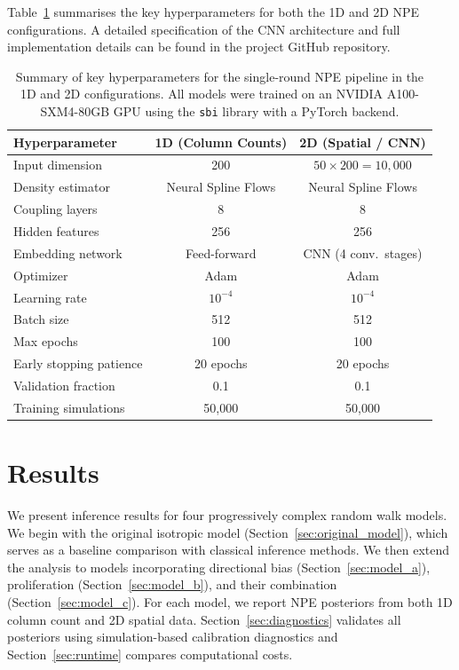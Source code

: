 \documentclass{article}
\begin{document}
Table~\ref{tab:hyperparameters} summarises the key hyperparameters for both the 1D and 2D NPE configurations. A detailed specification of the CNN architecture and full implementation details can be found in the project GitHub repository.

\begin{table}[htbp]
	\centering
	\renewcommand{\arraystretch}{1.2}
	\begin{tabular}{@{}lcc@{}}
		\toprule
		\textbf{Hyperparameter} & \textbf{1D (Column Counts)} & \textbf{2D (Spatial / CNN)} \\
		\midrule
		Input dimension & 200 & $50 \times 200 = 10{,}000$ \\
		Density estimator & Neural Spline Flows & Neural Spline Flows \\
		Coupling layers & 8 & 8 \\
		Hidden features & 256 & 256 \\
		Embedding network & Feed-forward & CNN (4 conv.\ stages) \\
		Optimizer & Adam & Adam \\
		Learning rate & $10^{-4}$ & $10^{-4}$ \\
		Batch size & 512 & 512 \\
		Max epochs & 100 & 100 \\
		Early stopping patience & 20 epochs & 20 epochs \\
		Validation fraction & 0.1 & 0.1 \\
		Training simulations & 50{,}000 & 50{,}000 \\
		\bottomrule
	\end{tabular}
	\caption{Summary of key hyperparameters for the single-round NPE pipeline in the 1D and 2D configurations. All models were trained on an NVIDIA A100-SXM4-80GB GPU using the \texttt{sbi} library \citep{Boelts2025sbi} with a PyTorch backend.}
	\label{tab:hyperparameters}
\end{table}



\section{Results}\label{sec:results}

We present inference results for four progressively complex random walk models. We begin with the original isotropic model (Section~\ref{sec:original_model}), which serves as a baseline comparison with classical inference methods. We then extend the analysis to models incorporating directional bias (Section~\ref{sec:model_a}), proliferation (Section~\ref{sec:model_b}), and their combination (Section~\ref{sec:model_c}). For each model, we report NPE posteriors from both 1D column count and 2D spatial data. Section~\ref{sec:diagnostics} validates all posteriors using simulation-based calibration diagnostics and Section~\ref{sec:runtime} compares computational costs.
\end{document}
